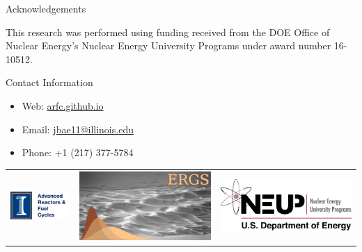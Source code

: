 \documentclass[final]{beamer}
\newlength{\onecolwid}
\begin{document}
\begin{frame}[t]
\begin{columns}[t]
\begin{column}{\onecolwid}

\begin{block}{Acknowledgements}

This research was performed using funding received
from the DOE Office of Nuclear Energy's Nuclear Energy
University Programs under award number 16-10512.

\end{block}




\begin{alertblock}{Contact Information}

\begin{itemize}
	
	\item Web: \href{arfc.github.io}{arfc.github.io}
	\item Email: \href{mailto:jbae11@illinois.edu}{jbae11@illinois.edu}
	\item Phone: +1 (217) 377-5784
\end{itemize}

\end{alertblock}

\begin{center}
\begin{tabular}{ccc}
\includegraphics[width=0.3\linewidth]{logo.png} & \includegraphics[width=0.3\linewidth]{ergs_logo.png} & \includegraphics[width=0.3\linewidth]{neup.png}
\end{tabular}
\end{center}


\end{column} %

\end{columns} %

\end{frame} %
\end{document}
